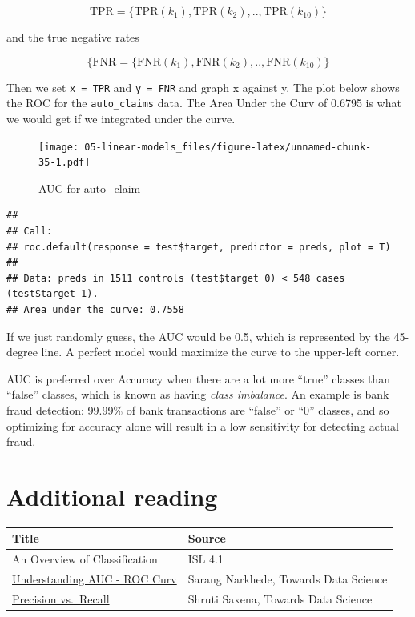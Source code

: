 \documentclass[openany]{book}
\newenvironment{Shaded}{\begin{snugshade}}{\end{snugshade}}
\newcommand{\DataTypeTok}[1]{\textcolor[rgb]{0.13,0.29,0.53}{#1}}
\newcommand{\KeywordTok}[1]{\textcolor[rgb]{0.13,0.29,0.53}{\textbf{#1}}}
\newcommand{\NormalTok}[1]{#1}
\newcommand{\OperatorTok}[1]{\textcolor[rgb]{0.81,0.36,0.00}{\textbf{#1}}}
\begin{document}
\[\text{TPR} = \{\text{TPR}(k_1), \text{TPR}(k_2), .., \text{TPR}(k_{10})\} \]

and the true negative rates

\[\{\text{FNR} = \{\text{FNR}(k_1), \text{FNR}(k_2), .., \text{FNR}(k_{10})\}\]

Then we set \texttt{x\ =\ TPR} and \texttt{y\ =\ FNR} and graph x against y. The plot below shows the ROC for the \texttt{auto\_claims} data. The Area Under the Curv of 0.6795 is what we would get if we integrated under the curve.

\begin{Shaded}
\end{Shaded}

\begin{figure}
\centering
\texttt{[image: 05-linear-models\_files/figure-latex/unnamed-chunk-35-1.pdf]}
\caption{\label{fig:unnamed-chunk-35}AUC for auto\_claim}
\end{figure}

\begin{verbatim}
## 
## Call:
## roc.default(response = test$target, predictor = preds, plot = T)
## 
## Data: preds in 1511 controls (test$target 0) < 548 cases (test$target 1).
## Area under the curve: 0.7558
\end{verbatim}

If we just randomly guess, the AUC would be 0.5, which is represented by the 45-degree line. A perfect model would maximize the curve to the upper-left corner.

AUC is preferred over Accuracy when there are a lot more ``true'' classes than ``false'' classes, which is known as having \emph{class imbalance}. An example is bank fraud detection: 99.99\% of bank transactions are ``false'' or ``0'' classes, and so optimizing for accuracy alone will result in a low sensitivity for detecting actual fraud.

\hypertarget{additional-reading}{%
\section{Additional reading}\label{additional-reading}}

\begin{longtable}[]{@{}ll@{}}
\toprule
Title & Source\tabularnewline
\midrule
\endhead
An Overview of Classification & ISL 4.1\tabularnewline
\href{https://towardsdatascience.com/understanding-auc-roc-curve-68b2303cc9c5\#:~:targetText=What\%20is\%20AUC\%20\%2D\%20ROC\%20Curve\%3F,capable\%20of\%20distinguishing\%20between\%20classes.}{Understanding AUC - ROC Curv} & Sarang Narkhede, Towards Data Science\tabularnewline
\href{https://towardsdatascience.com/precision-vs-recall-386cf9f89488\#:~:targetText=Precision\%20and\%20recall\%20are\%20two,correctly\%20classified\%20by\%20your\%20algorithm.}{Precision vs.~Recall} & Shruti Saxena, Towards Data Science\tabularnewline
\bottomrule
\end{longtable}
\end{document}
